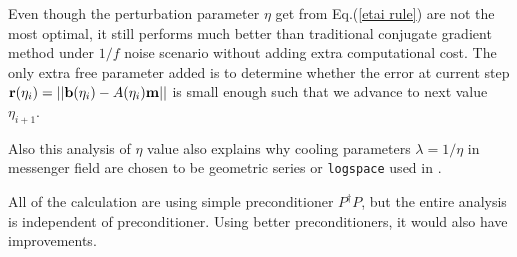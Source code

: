 \documentclass[twocolumn,linenumbers]{aastex631}
\newcommand{\vbd}{\vb{d}}
\newcommand{\vbm}{\vb{m}}
\newcommand{\vbb}{\vb{b}}
\newcommand{\inv}[1]{#1^{-1}}
\newcommand{\hatm}{\vb{\hat{m}}}
\newcommand{\Pdagger}{P^{\dagger}}
\newcommand{\Nbar}{\bar{N}}
\newcommand{\PPinv}[1]{\inv{\qty(\Pdagger #1 P)}}
\begin{document}
%

Even though the perturbation parameter $\eta$ get from Eq.(\ref{etai rule}) are
not the most optimal,
it still performs much better than traditional conjugate gradient method under
$1/f$ noise scenario without adding extra computational cost.
The only extra free parameter added is to determine whether the error at
current step $\vb{r}(\eta_i) = \qty||\vbb(\eta_i) - A(\eta_i) \vbm||$ is small
enough such that we advance to next value $\eta_{i+1}$.


Also this analysis of $\eta$ value also explains why cooling parameters
$\lambda=1/\eta$ in messenger field are chosen to be geometric series or
\texttt{logspace} used in \cite{Huffenberger_2018}.

All of the calculation are using simple preconditioner $\Pdagger P$, but 
the entire analysis is independent of preconditioner.
Using better preconditioners, it would also have improvements.
\end{document}
